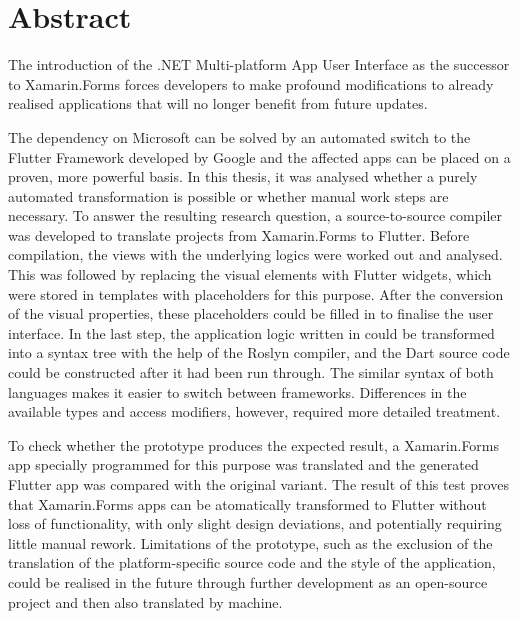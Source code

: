 \chapter*{Abstract}

The introduction of the .NET Multi-platform App User Interface as the successor to Xamarin.Forms forces developers to make profound modifications to already realised applications that will no longer benefit from future updates.

The dependency on Microsoft can be solved by an automated switch to the Flutter Framework developed by Google and the affected apps can be placed on a proven, more powerful basis. In this thesis, it was analysed whether a purely automated transformation is possible or whether manual work steps are necessary.  To answer the resulting research question, a source-to-source compiler was developed to translate projects from Xamarin.Forms to Flutter. Before compilation, the views with the underlying logics were worked out and analysed.  This was followed by replacing the visual elements with Flutter widgets, which were stored in templates with placeholders for this purpose. After the conversion of the visual properties, these placeholders could be filled in to finalise the user interface.  In the last step, the application logic written in \Csharp{} could be transformed into a syntax tree with the help of the Roslyn compiler, and the Dart source code could be constructed after it had been run through. The similar syntax of both languages makes it easier to switch between frameworks.  Differences in the available types and access modifiers, however, required more detailed treatment.

To check whether the prototype produces the expected result, a Xamarin.Forms app specially programmed for this purpose was translated and the generated Flutter app was compared with the original variant. The result of this test proves that Xamarin.Forms apps can be atomatically transformed to Flutter without loss of functionality, with only slight design deviations, and potentially requiring little manual rework.  Limitations of the prototype, such as the exclusion of the translation of the platform-specific source code and the style of the application, could be realised in the future through further development as an open-source project and then also translated by machine.

